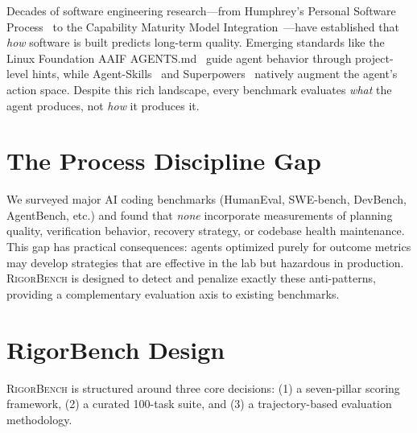 \documentclass[letterpaper, 10 pt, conference]{ieeeconf}
\newcommand{\bench}{\textsc{RigorBench}}
\begin{document}
Decades of software engineering research---from Humphrey's Personal Software Process~\cite{humphrey1989managing} to the Capability Maturity Model Integration~\cite{cmmi2018}---have established that \emph{how} software is built predicts long-term quality. Emerging standards like the Linux Foundation AAIF AGENTS.md~\cite{linuxfoundation2024agentsmd} guide agent behavior through project-level hints, while Agent-Skills~\cite{osmani2024agentskills} and Superpowers~\cite{obra2024superpowers} natively augment the agent's action space. Despite this rich landscape, every benchmark evaluates \emph{what} the agent produces, not \emph{how} it produces it.

\section{The Process Discipline Gap}
We surveyed major AI coding benchmarks (HumanEval, SWE-bench, DevBench, AgentBench, etc.) and found that \emph{none} incorporate measurements of planning quality, verification behavior, recovery strategy, or codebase health maintenance. This gap has practical consequences: agents optimized purely for outcome metrics may develop strategies that are effective in the lab but hazardous in production. \bench{} is designed to detect and penalize exactly these anti-patterns, providing a complementary evaluation axis to existing benchmarks.

\section{RigorBench Design}
\bench{} is structured around three core decisions: (1) a seven-pillar scoring framework, (2) a curated 100-task suite, and (3) a trajectory-based evaluation methodology.
\end{document}
